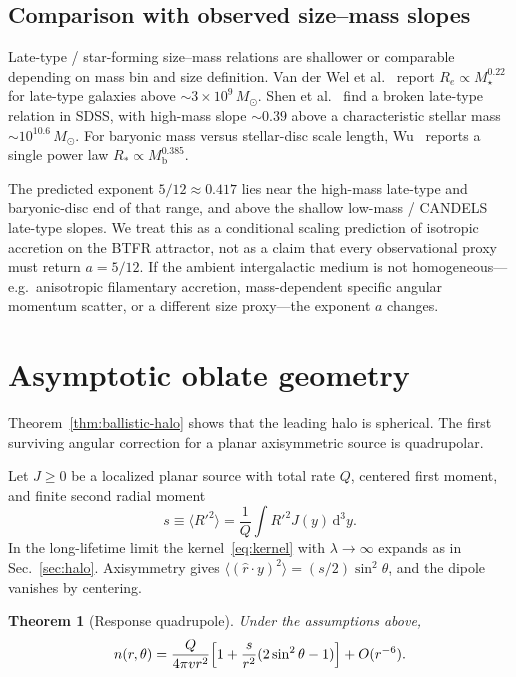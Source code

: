 \documentclass[11pt]{article}
\newtheorem{theorem}{Theorem}[section]
\theoremstyle{definition}
\theoremstyle{remark}
\newcommand{\dd}{\mathrm{d}}
\newcommand{\Mb}{M_{\mathrm{b}}}
\begin{document}
\subsection{Comparison with observed size--mass slopes}
Late-type / star-forming size--mass relations are shallower or comparable depending on mass bin and size definition.
Van der Wel et al.~\cite{vanderwel2014} report $R_{e}\propto M_{\star}^{0.22}$ for late-type galaxies above $\sim3\times10^{9}\,M_{\odot}$.
Shen et al.~\cite{shen2003} find a broken late-type relation in SDSS, with high-mass slope $\sim0.39$ above a characteristic stellar mass $\sim10^{10.6}\,M_{\odot}$.
For baryonic mass versus stellar-disc scale length, Wu~\cite{wu2018} reports a single power law $R_{\ast}\propto\Mb^{0.385}$.

The predicted exponent $5/12\approx0.417$ lies near the high-mass late-type and baryonic-disc end of that range, and above the shallow low-mass / CANDELS late-type slopes.
We treat this as a conditional scaling prediction of isotropic accretion on the BTFR attractor, not as a claim that every observational proxy must return $a=5/12$.
If the ambient intergalactic medium is not homogeneous---e.g.\ anisotropic filamentary accretion, mass-dependent specific angular momentum scatter, or a different size proxy---the exponent $a$ changes.

\section{Asymptotic oblate geometry}
\label{sec:oblate}
Theorem~\ref{thm:ballistic-halo} shows that the leading halo is spherical.
The first surviving angular correction for a planar axisymmetric source is quadrupolar.

Let $J\ge0$ be a localized planar source with total rate $Q$, centered first moment, and finite second radial moment
\begin{equation}
  s\equiv\langle R'^{2}\rangle=\frac1Q\int R'^{2}J(y)\,\dd^{3}y.
\end{equation}
In the long-lifetime limit the kernel~\eqref{eq:kernel} with $\lambda\to\infty$ expands as in Sec.~\ref{sec:halo}.
Axisymmetry gives $\langle(\hat r\cdot y)^{2}\rangle=(s/2)\sin^{2}\theta$, and the dipole vanishes by centering.

\begin{theorem}[Response quadrupole]
\label{thm:transport-quad}
Under the assumptions above,
\begin{equation}
  n(r,\theta)=\frac{Q}{4\pi v r^{2}}\Bigl[1+\frac{s}{r^{2}}(2\sin^{2}\theta-1)\Bigr]+O(r^{-6}).
  \label{eq:nquad}
\end{equation}
\end{theorem}
\end{document}
